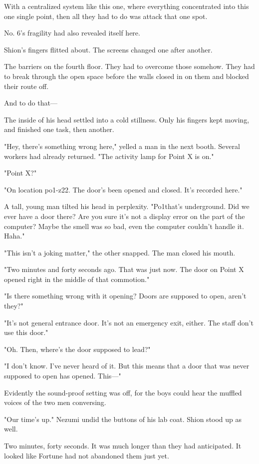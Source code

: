 With a centralized system like this one, where everything concentrated
into this one single point, then all they had to do was attack that one
spot.

No. 6's fragility had also revealed itself here.

Shion's fingers flitted about. The screens changed one after another.

The barriers on the fourth floor. They had to overcome those somehow.
They had to break through the open space before the walls closed in on
them and blocked their route off.

And to do that---

The inside of his head settled into a cold stillness. Only his fingers
kept moving, and finished one task, then another.

"Hey, there's something wrong here," yelled a man in the next booth.
Several workers had already returned. "The activity lamp for Point X is
on."

"Point X?"

"On location po1-z22. The door's been opened and closed. It's recorded
here."

A tall, young man tilted his head in perplexity. "Po1\el that's
underground. Did we ever have a door there? Are you sure it's not a
display error on the part of the computer? Maybe the smell was so bad,
even the computer couldn't handle it. Haha."

"This isn't a joking matter," the other snapped. The man closed his
mouth.

"Two minutes and forty seconds ago. That was just now. The door on Point
X opened right in the middle of that commotion."

"Is there something wrong with it opening? Doors are supposed to open,
aren't they?"

"It's not general entrance door. It's not an emergency exit, either. The
staff don't use this door."

"Oh. Then, where's the door supposed to lead?"

"I don't know. I've never heard of it. But this means that a door that
was never supposed to open has opened. This---"

Evidently the sound-proof setting was off, for the boys could hear the
muffled voices of the two men conversing.

"Our time's up." Nezumi undid the buttons of his lab coat. Shion stood
up as well.

Two minutes, forty seconds. It was much longer than they had
anticipated. It looked like Fortune had not abandoned them just yet.

